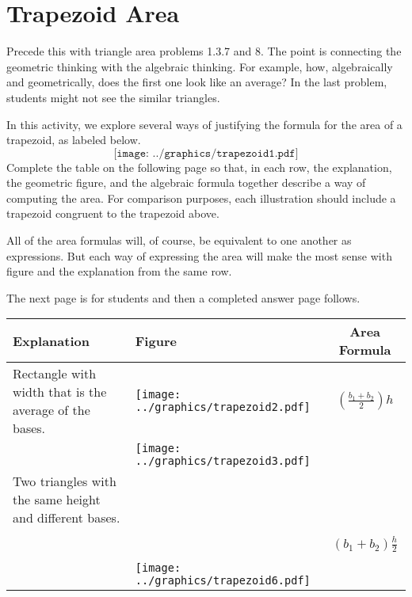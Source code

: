 \newpage

\section{Trapezoid Area}
\begin{teachingnote}
Precede this with triangle area problems 1.3.7 and 8.  The point is connecting the geometric thinking with the algebraic thinking.  For example, how, algebraically and geometrically, does the first one look like an average?  In the last problem, students might not see the similar triangles.
\end{teachingnote}

\begin{prob}
In this activity, we explore several ways of justifying the formula for the area of a trapezoid, as labeled below. 
\[
\texttt{[image: ../graphics/trapezoid1.pdf]}
\]
Complete the table on the following page so that, in each row, the explanation, the geometric figure, and the algebraic formula together describe a way of computing the area.  For comparison purposes, each illustration should include a trapezoid congruent to the trapezoid above.   

All of the area formulas will, of course, be equivalent to one another as expressions.  But each way of expressing the area will make the most sense with figure and the explanation from the same row.  

\begin{teachingnote}
The next page is for students and then a completed answer page follows.
\end{teachingnote}



\newpage

\newlength{\formulawidth}

{\renewcommand{\arraystretch}{1.5}
\begin{tabular}{|>{\centering\arraybackslash}m{2.5cm}|>{\centering\arraybackslash}m{9.5cm}|c|}\hline
Explanation & Figure & Area Formula \\\hline

Rectangle with width that is the average of the bases. & \texttt{[image: ../graphics/trapezoid2.pdf]} & $\left(\frac{b_1+b_2}{2}\right)h$ \\ \hline
                              & \texttt{[image: ../graphics/trapezoid3.pdf]} &                      \\ \hline
Two triangles with the same height and different bases. &                 & \\ \hline
 & & \\ 
\bigskip                              &  & $(b_1+b_2)\frac{h}{2}$ \\ 
 & & \\ \hline
          & \texttt{[image: ../graphics/trapezoid6.pdf]}&  \hspace{\formulawidth} \\ \hline
\end{tabular}}


\end{prob}
